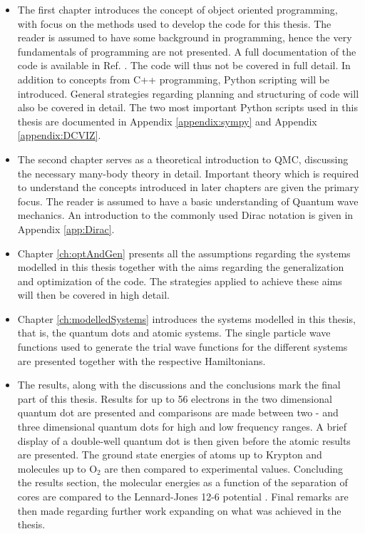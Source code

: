 \begin{itemize}
 \item The first chapter introduces the concept of object oriented programming, with focus on the methods used to develop the code for this thesis. The reader is assumed to have some background in programming, hence the very fundamentals of programming are not presented. A full documentation of the code is available in Ref. \cite{libBorealisCode}. The code will thus not be covered in full detail. In addition to concepts from C++ programming, Python scripting will be introduced. General strategies regarding planning and structuring of code will also be covered in detail. The two most important Python scripts used in this thesis are documented in Appendix \ref{appendix:sympy} and Appendix \ref{appendix:DCVIZ}.
 
 \item The second chapter serves as a theoretical introduction to QMC, discussing the necessary many-body theory in detail. Important theory which is required to understand the concepts introduced in later chapters are given the primary focus. The reader is assumed to have a basic understanding of Quantum wave mechanics. An introduction to the commonly used Dirac notation is given in Appendix \ref{app:Dirac}.
 
 \item Chapter \ref{ch:optAndGen} presents all the assumptions regarding the systems modelled in this thesis together with the aims regarding the generalization and optimization of the code. The strategies applied to achieve these aims will then be covered in high detail.
 
 \item Chapter \ref{ch:modelledSystems} introduces the systems modelled in this thesis, that is, the quantum dots and atomic systems. The single particle wave functions used to generate the trial wave functions for the different systems are presented together with the respective Hamiltonians.
 
 \item The results, along with the discussions and the conclusions mark the final part of this thesis. Results for up to 56 electrons in the two dimensional quantum dot are presented and comparisons are made between two - and three dimensional quantum dots for high and low frequency ranges. A brief display of a double-well quantum dot is then given before the atomic results are presented. The ground state energies of atoms up to Krypton and molecules up to $\mathrm{O_2}$ are then compared to experimental values. Concluding the results section, the molecular energies as a function of the separation of cores are compared to the Lennard-Jones 12-6 potential \cite{MD1, MD2}. Final remarks are then made regarding further work expanding on what was achieved in the thesis. 
\end{itemize}

\cite{CCSD_WF}